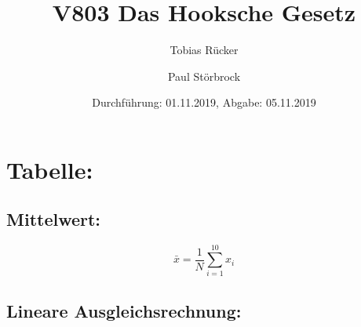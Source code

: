

\title{V803 Das Hooksche Gesetz}
\author{Tobias Rücker \and Paul Störbrock}
\date{Durchführung: 01.11.2019, Abgabe: 05.11.2019}


\maketitle


\newpage
\section{Tabelle:}   
\begin{table}
    \centering
    \label{tab:data}
       
\end{table}
    \subsection{Mittelwert:}
    \begin{equation}
        \bar{x} = \frac{1}{N}\sum\limits_{i=1}^{10}
            x_i
    \end{equation}

    \subsection{Lineare Ausgleichsrechnung:}
